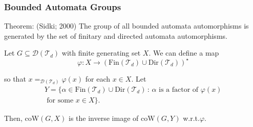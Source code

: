 \documentclass[11pt]{beamer}
\begin{document}
\begin{frame}
\frametitle{Bounded Automata Groups}

\begin{block}{Theorem: (Sidki; 2000)}
	The group of all bounded automata automorphisms is generated by the set of finitary and directed automata automorphisms.
\end{block}

Let $G \subseteq \mathcal{D}(\mathcal{T}_d)$ with finite generating set $X$.
We can define a map
\vspace{-1em}
\[
\varphi:
X
\to
\left(
\mathrm{Fin}(\mathcal{T}_d) \cup \mathrm{Dir}(\mathcal{T}_d)
\right)^\star
\]

\vspace{-1em}
so that $x =_{\mathcal{D}(\mathcal{T}_d)} \varphi(x)$ for each $x \in X$.
Let
\vspace{-1em}
\begin{multline*}
Y
=
\Big\{
\alpha \in \mathrm{Fin}(\mathcal{T}_d) \cup \mathrm{Dir}(\mathcal{T}_d) 
\,:\,
\alpha \text{ is a factor of } \varphi(x)\\ \text{ for some } x \in X
\Big\}.
\end{multline*}

\vspace{-1em}
Then, $\mathrm{coW}(G,X)$ is the inverse image of $\mathrm{coW}(G,Y)$ w.r.t.\@ $\varphi$.

\end{frame}

\end{document}
